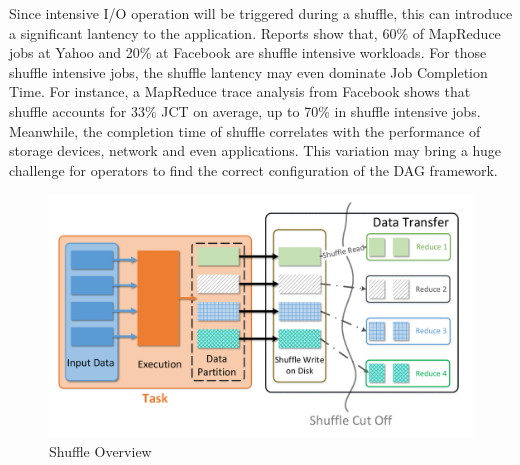 \documentclass[10pt,twocolumn]{article}
\begin{document}
Since intensive I/O operation will be triggered during a shuffle, this can introduce a significant lantency to the application. Reports show that, 60\% of MapReduce jobs at Yahoo
and 20\% at Facebook are shuffle intensive workloads\cite{shufflewatcher}. For those shuffle intensive jobs, the shuffle lantency may even dominate Job Completion Time. 
For instance, a MapReduce trace analysis from Facebook shows that shuffle accounts for 33\% JCT on average, up to 70\% in shuffle intensive jobs\cite{managing}.
Meanwhile, the completion time of shuffle correlates with the performance of storage devices, network and even applications. 
This variation may bring a huge challenge for operators to find the correct configuration of the DAG framework.
\begin{figure}
	\centering
	\includegraphics[width=\linewidth]{fig/shuffle_process}
	\caption{Shuffle Overview}
	\label{fig:shuffle_process}
\end{figure}
\end{document}
